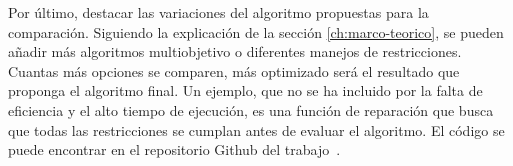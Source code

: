 Por último, destacar las variaciones del algoritmo propuestas para la comparación. Siguiendo la explicación de la sección \ref{ch:marco-teorico}, se pueden añadir más algoritmos multiobjetivo o diferentes manejos de restricciones. Cuantas más opciones se comparen, más optimizado será el resultado que proponga el algoritmo final. Un ejemplo, que no se ha incluido por la falta de eficiencia y el alto tiempo de ejecución, es una función de reparación que busca que todas las restricciones se cumplan antes de evaluar el algoritmo. El código se puede encontrar en el repositorio Github del trabajo~\cite{quesada_reparacion}.